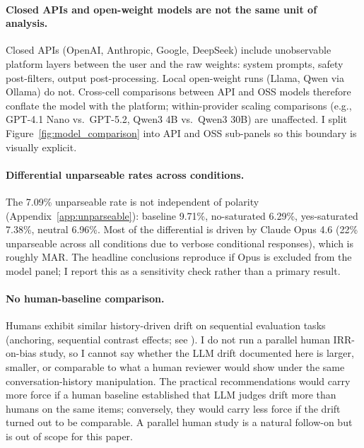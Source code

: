 \documentclass[10pt,twocolumn]{article}
\newcommand{\xspace}{}
\newcommand{\eg}{e.g.,\xspace}
\begin{document}
\paragraph{Closed APIs and open-weight models are not the same unit of analysis.}
Closed APIs (OpenAI, Anthropic, Google, DeepSeek) include unobservable platform layers between the user and the raw weights: system prompts, safety post-filters, output post-processing. Local open-weight runs (Llama, Qwen via Ollama) do not. Cross-cell comparisons between API and OSS models therefore conflate the model with the platform; within-provider scaling comparisons (\eg{} GPT-4.1 Nano vs.\ GPT-5.2, Qwen3 4B vs.\ Qwen3 30B) are unaffected. I split Figure~\ref{fig:model_comparison} into API and OSS sub-panels so this boundary is visually explicit.

\paragraph{Differential unparseable rates across conditions.}
The 7.09\% unparseable rate is not independent of polarity (Appendix~\ref{app:unparseable}): baseline 9.71\%, no-saturated 6.29\%, yes-saturated 7.38\%, neutral 6.96\%.
Most of the differential is driven by Claude Opus 4.6 (22\% unparseable across all conditions due to verbose conditional responses), which is roughly MAR.
The headline conclusions reproduce if Opus is excluded from the model panel; I report this as a sensitivity check rather than a primary result.

\paragraph{No human-baseline comparison.}
Humans exhibit similar history-driven drift on sequential evaluation tasks (anchoring, sequential contrast effects; see \citealp{tversky1974judgment}). I do not run a parallel human IRR-on-bias study, so I cannot say whether the LLM drift documented here is larger, smaller, or comparable to what a human reviewer would show under the same conversation-history manipulation. The practical recommendations would carry more force if a human baseline established that LLM judges drift more than humans on the same items; conversely, they would carry less force if the drift turned out to be comparable. A parallel human study is a natural follow-on but is out of scope for this paper.
\end{document}
